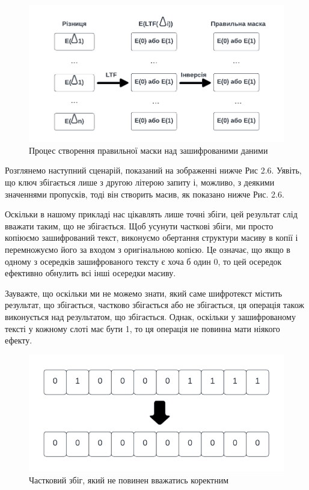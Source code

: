 \begin{itemize}
{\begin{figure}[!ht]
    \centering
    \label{fig:mask-creation-flow}
    \includegraphics[scale=1.25]{static/mask-creation-flow.png}
    \caption{Процес створення правильної маски над зашифрованими даними}
\end{figure}
Розглянемо наступний сценарій, показаний на зображенні нижче Рис 2.6. Уявіть, що ключ збігається лише з
другою літерою запиту і, можливо, з деякими значеннями пропусків, тоді він створить масив, як
показано нижче Рис. 2.6.

Оскільки в нашому прикладі нас цікавлять лише точні збіги, цей результат слід вважати таким, що
не збігається. Щоб усунути часткові збіги, ми просто копіюємо зашифрований текст, виконуємо
обертання структури масиву в копії і перемножуємо його за входом з оригінальною копією. Це
означає, що якщо в одному з осередків зашифрованого тексту є хоча б один 0, то цей осередок
ефективно обнулить всі інші осередки масиву.

Зауважте, що оскільки ми не можемо знати, який саме шифротекст містить результат, що збігається,
частково збігається або не збігається, ця операція також виконується над результатом, що
збігається. Однак, оскільки у зашифрованому тексті у кожному слоті має бути 1, то ця операція не
повинна мати ніякого ефекту.

\begin{figure}[!ht]
    \centering
    \label{fig:partial-match}
    \includegraphics{static/partial-match.png}
    \caption{Частковий збіг, який не повинен вважатись коректним}
\end{figure}

}
\end{itemize}
